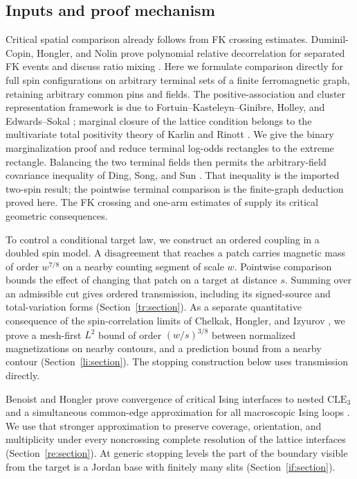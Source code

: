 \documentclass[11pt]{article}
\theoremstyle{definition}
\theoremstyle{remark}
\numberwithin{equation}{section}
\begin{document}
\subsection{Inputs and proof mechanism}
Critical spatial comparison already follows from FK crossing estimates.
Duminil-Copin, Hongler, and Nolin prove polynomial relative decorrelation
for separated FK events and discuss ratio mixing
\cite[Section~5.3, Proposition~5.11, author-hosted version]{DHN2011}.
Here we formulate comparison directly for full spin configurations on
arbitrary terminal sets of a finite ferromagnetic graph, retaining
arbitrary common pins and fields. The positive-association and cluster
representation framework is due to Fortuin--Kasteleyn--Ginibre, Holley,
and Edwards--Sokal \cite{FKG1971,Holley1974,EdwardsSokal1988};
marginal closure of the lattice condition belongs to the multivariate
total positivity theory of Karlin and Rinott \cite{KarlinRinott1980}.
We give the binary marginalization proof and reduce terminal log-odds
rectangles to the extreme rectangle. Balancing the two terminal fields
then permits the arbitrary-field covariance inequality of Ding, Song,
and Sun \cite[Corollary~1.3]{DSS2023}. That inequality is the imported
two-spin result; the pointwise terminal comparison is the finite-graph
deduction proved here. The FK crossing and one-arm estimates of
\cite{DHN2011} supply its critical geometric consequences.

To control a conditional target law, we construct an ordered coupling
in a doubled spin model. A disagreement that reaches a patch carries
magnetic mass of order $w^{7/8}$ on a nearby counting segment of scale
$w$. Pointwise comparison bounds the effect of changing that patch on
a target at distance $s$. Summing over an admissible cut gives ordered
transmission, including its signed-source and total-variation forms
(Section~\ref{tr:section}). As a separate quantitative consequence of
the spin-correlation limits of Chelkak, Hongler, and Izyurov
\cite{CHI2021}, we prove a mesh-first $L^2$ bound of order $(w/s)^{3/8}$
between normalized magnetizations on nearby contours, and a prediction
bound from a nearby contour (Section~\ref{li:section}). The stopping
construction below uses transmission directly.

Benoist and Hongler prove convergence of critical Ising interfaces to
nested $\mathrm{CLE}_3$ and a simultaneous common-edge approximation
for all macroscopic Ising loops \cite{BH2019}. We use that stronger
approximation to preserve coverage, orientation, and multiplicity under
every noncrossing complete resolution of the lattice interfaces
(Section~\ref{re:section}). At generic stopping levels the part of the
boundary visible from the target is a Jordan base with finitely many
slits (Section~\ref{if:section}).
\end{document}
